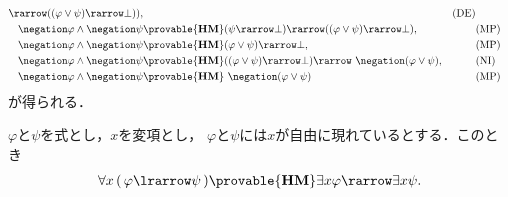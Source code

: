 \begin{sketch}[DM$\vee$]
\begin{align}
				\rarrow ((\varphi \vee \psi) \rarrow \bot)), && \mbox{(DE)}\\
			\negation \varphi \wedge \negation \psi &\provable{\mbox{{\bf HM}}} 
				(\psi \rarrow \bot) \rarrow ((\varphi \vee \psi) \rarrow \bot), && \mbox{(MP)}\\
			\negation \varphi \wedge \negation \psi &\provable{\mbox{{\bf HM}}} 
				(\varphi \vee \psi) \rarrow \bot, && \mbox{(MP)}\\
			\negation \varphi \wedge \negation \psi &\provable{\mbox{{\bf HM}}} 
				((\varphi \vee \psi) \rarrow \bot) \rarrow\ \negation (\varphi \vee \psi), && \mbox{(NI)}\\
			\negation \varphi \wedge \negation \psi &\provable{\mbox{{\bf HM}}} 
				\ \negation (\varphi \vee \psi) && \mbox{(MP)}
		\end{align}
		が得られる．
		\QED
	\end{sketch}
	
	\begin{screen}
		\begin{thm}
			$\varphi$と$\psi$を式とし，$x$を変項とし，
			$\varphi$と$\psi$には$x$が自由に現れているとする．このとき
			\begin{align}
				\forall x\, (\, \varphi \lrarrow \psi\, ) \provable{\mbox{{\bf HM}}}
				\exists x \varphi \rarrow \exists x \psi.
			\end{align}
		\end{thm}
	\end{screen}
	
